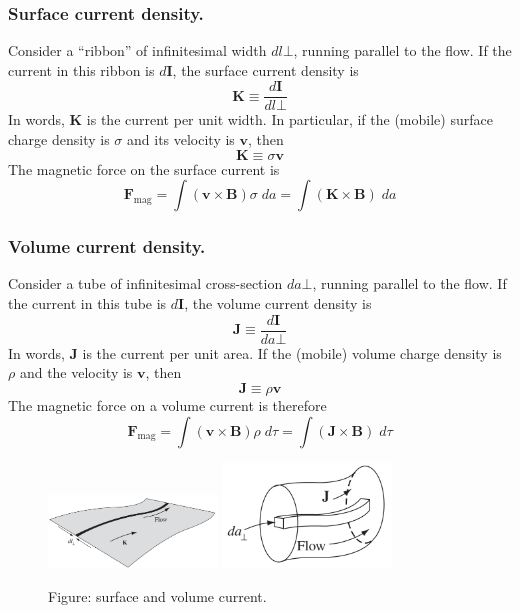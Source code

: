 \documentclass[../../../main.tex]{subfiles}
\begin{document}
\subsubsection*{Surface current density.} Consider a “ribbon” of inﬁnitesimal width $dl\bot$, running parallel to the ﬂow. If the current in this ribbon is $d\mathbf{I}$, the surface current density is
\begin{equation*}
    \mathbf{K}\equiv\frac{d\mathbf{I}}{dl\bot}
\end{equation*}
In words, $\mathbf{K}$ is the current per unit width. In particular, if the (mobile) surface charge density is $\sigma$ and its velocity is $\mathbf{v}$, then
\begin{equation*}
    \mathbf{K}\equiv\sigma\mathbf{v}
\end{equation*}
The magnetic force on the surface current is
\begin{equation*}
    \mathbf{F}_{\text{mag}}=\int (\mathbf{v}\times\mathbf{B})\sigma\;da= \int (\mathbf{K}\times\mathbf{B})\;da
\end{equation*}

\subsubsection*{Volume current density.} Consider a tube of inﬁnitesimal cross-section $da\bot$, running parallel to the ﬂow. If the current in this tube is $d\mathbf{I}$, the volume current density is
\begin{equation*}
    \mathbf{J}\equiv\frac{d\mathbf{I}}{da\bot}
\end{equation*}
In words, $\mathbf{J}$ is the current per unit area. If the (mobile) volume charge density is $\rho$ and the velocity is $\mathbf{v}$, then
\begin{equation*}
    \mathbf{J}\equiv\rho\mathbf{v}
\end{equation*}
The magnetic force on a volume current is therefore
\begin{equation*}
    \mathbf{F}_{\text{mag}}=\int (\mathbf{v}\times\mathbf{B})\rho\;d\tau= \int (\mathbf{J}\times\mathbf{B})\;d\tau
\end{equation*}

\begin{figure}
    \centering
    \includegraphics[width=0.4\textwidth]{../Rss/Electromagnetism/Magnetostatics/SurfCurrent}
    \includegraphics[width=0.4\textwidth]{../Rss/Electromagnetism/Magnetostatics/VolCurrent}
    \caption*{Figure: surface and volume current.}
\end{figure}
\end{document}

